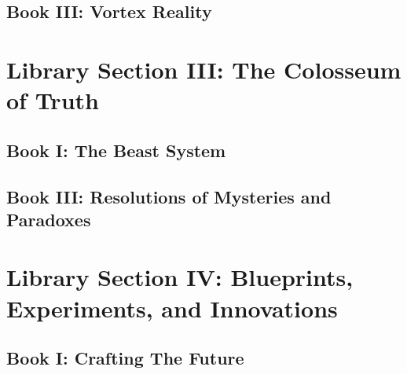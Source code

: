 \documentclass[a4paper,12pt]{book}
\begin{document}
\chapter{Book III: Vortex Reality}




\part{Library Section III: The Colosseum of Truth}

\chapter{Book I: The Beast System}








\chapter{Book III: Resolutions of Mysteries and Paradoxes}



\part{Library Section IV: Blueprints, Experiments, and Innovations}

\chapter{Book I: Crafting The Future}






\end{document}
